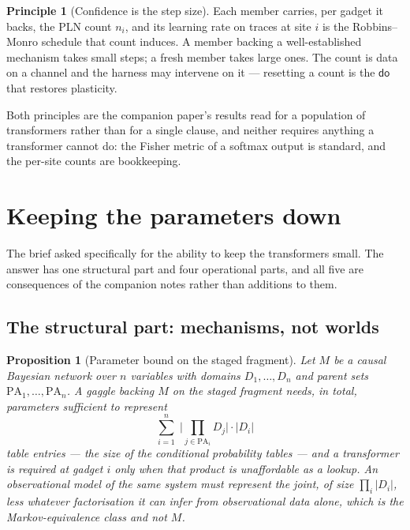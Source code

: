 \documentclass[11pt]{article}
\theoremstyle{plain}
\newtheorem{proposition}[theorem]{Proposition}
\theoremstyle{definition}
\newtheorem{principle}[theorem]{Principle}
\theoremstyle{remark}
\newcommand{\dok}{\textsf{do}}
\newcommand{\PA}{\mathrm{PA}}
\begin{document}
\begin{principle}[Confidence is the step size]
Each member carries, per gadget it backs, the PLN count $n_i$, and its learning
rate on traces at site $i$ is the Robbins--Monro schedule that count induces.
A member backing a well-established mechanism takes small steps; a fresh member
takes large ones. The count is data on a channel and the harness may intervene
on it --- resetting a count is the $\dok$ that restores plasticity.
\end{principle}

Both principles are the companion paper's results read for a population of
transformers rather than for a single clause, and neither requires anything a
transformer cannot do: the Fisher metric of a softmax output is standard, and
the per-site counts are bookkeeping.

\section{Keeping the parameters down}\label{sec:levers}

The brief asked specifically for the ability to keep the transformers small.
The answer has one structural part and four operational parts, and all five
are consequences of the companion notes rather than additions to them.

\subsection{The structural part: mechanisms, not worlds}

\begin{proposition}[Parameter bound on the staged fragment]\label{prop:bound}
Let $M$ be a causal Bayesian network over $n$ variables with domains
$D_1, \dots, D_n$ and parent sets $\PA_1, \dots, \PA_n$. A gaggle backing $M$
on the staged fragment needs, in total, parameters sufficient to represent
\[
\sum_{i=1}^{n} \;\Big|\textstyle\prod_{j \in \PA_i} D_j\Big| \cdot |D_i|
\]
table entries --- the size of the conditional probability tables --- and a
transformer is required at gadget $i$ only when that product is unaffordable as
a lookup. An observational model of the same system must represent the joint,
of size $\prod_i |D_i|$, less whatever factorisation it can infer from
observational data alone, which is the Markov-equivalence class and not $M$.
\end{proposition}
\end{document}
